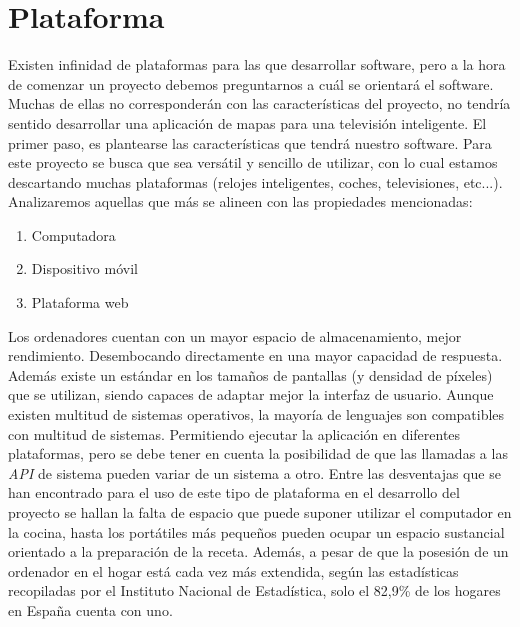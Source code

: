 \section{Plataforma}
Existen infinidad de plataformas para las que desarrollar software, pero a la hora de comenzar un proyecto debemos preguntarnos a cuál se orientará el software. Muchas de ellas no corresponderán con las características del proyecto, no tendría sentido desarrollar una aplicación de mapas para una televisión inteligente. 
El primer paso, es plantearse las características que tendrá nuestro software. Para este proyecto se busca que sea versátil y sencillo de utilizar, con lo cual estamos descartando muchas plataformas (relojes inteligentes, coches, televisiones, etc...). Analizaremos aquellas que más se alineen con las propiedades mencionadas: 
\begin{enumerate}
    \item Computadora
    \item Dispositivo móvil
    \item Plataforma web
\end{enumerate}
Los ordenadores cuentan con un mayor espacio de almacenamiento, mejor rendimiento. Desembocando directamente en una mayor capacidad de respuesta. Además existe un estándar en los tamaños de pantallas (y densidad de píxeles) que se utilizan, siendo capaces de adaptar mejor la interfaz de usuario. Aunque existen multitud de sistemas operativos, la mayoría de lenguajes son compatibles con multitud de sistemas. Permitiendo ejecutar la aplicación en diferentes plataformas, pero se debe tener en cuenta la posibilidad de que las llamadas a las \emph{API} de sistema pueden variar de un sistema a otro. Entre las desventajas que se han encontrado para el uso de este tipo de plataforma en el desarrollo del proyecto se hallan la falta de espacio que puede suponer utilizar el computador en la cocina, hasta los portátiles más pequeños pueden ocupar un espacio sustancial orientado a la preparación de la receta. Además, a pesar de que la posesión de un ordenador en el hogar está cada vez más extendida, según las estadísticas recopiladas por el Instituto Nacional de Estadística, solo el 82,9\% de los hogares en España cuenta con uno.

